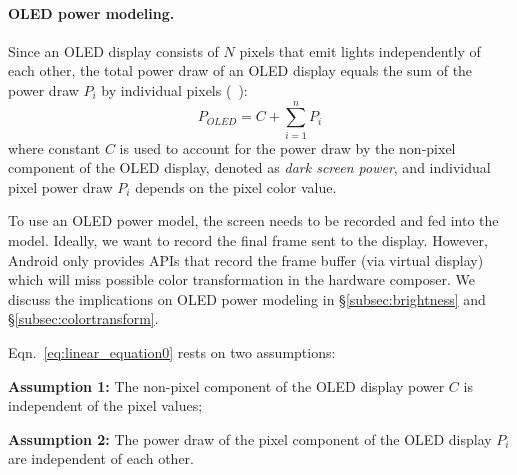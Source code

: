 \paragraph{OLED power modeling.}
Since an OLED display consists of $N$ pixels that emit lights
independently of each other, the total power draw of an OLED display
equals the sum of the power draw $P_i$ by individual pixels
(\eg~\cite{dong2009current,kim2013runtime}):
\begin{equation}
	P_{OLED} = C + \sum_{i=1}^{n}{P_i}
	\label{eq:linear_equation0}
\end{equation}
where constant $C$ is used to account for the 
power draw by
the non-pixel component of the OLED display,
denoted as {\em dark screen power},
and individual pixel power draw $P_i$ depends on
the pixel color value.

To use an OLED power model, the screen needs to be recorded and
fed into the model.  Ideally, we want to record the final frame 
sent to the display.  However, Android only provides APIs that record
the frame buffer (via virtual display)  which will miss possible
color transformation in the hardware composer.  We discuss the implications
on OLED power modeling in \S\ref{subsec:brightness} and
\S\ref{subsec:colortransform}.


Eqn.~\ref{eq:linear_equation0} rests on two assumptions:

\noindent
{\bf Assumption 1:} The non-pixel component of the OLED display power $C$ is independent
of the pixel values;

\noindent
{\bf Assumption 2:} The power draw of the pixel component of the OLED display $P_i$
are independent of each other.
\fi


